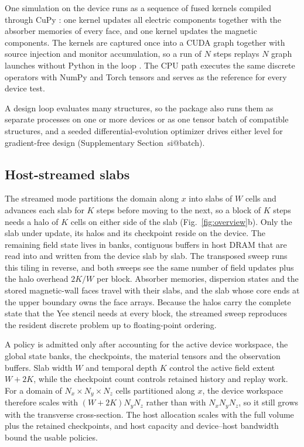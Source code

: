 \documentclass[preprint,11pt]{elsarticle}
\makeatletter
\newcommand{\suppsec}[1]{Supplementary Section~\csname si@#1\endcsname}
\makeatother
\begin{document}
One simulation on the device runs as a sequence of fused kernels compiled through CuPy \citep{okuta2017}: one kernel updates all electric components together with the absorber memories of every face, and one kernel updates the magnetic components. The kernels are captured once into a CUDA graph together with source injection and monitor accumulation, so a run of $N$ steps replays $N$ graph launches without Python in the loop \citep{paszke2019}. The CPU path executes the same discrete operators with NumPy and Torch tensors and serves as the reference for every device test.

A design loop evaluates many structures, so the package also runs them as separate processes on one or more devices or as one tensor batch of compatible structures, and a seeded differential-evolution optimizer \citep{storn1997} drives either level for gradient-free design (\suppsec{batch}).

\subsection{Host-streamed slabs}
\label{sec:streaming}

The streamed mode partitions the domain along $x$ into slabs of $W$ cells and advances each slab for $K$ steps before moving to the next, so a block of $K$ steps needs a halo of $K$ cells on either side of the slab (Fig.~\ref{fig:overview}b). Only the slab under update, its halos and its checkpoint reside on the device. The remaining field state lives in banks, contiguous buffers in host DRAM that are read into and written from the device slab by slab. The transposed sweep runs this tiling in reverse, and both sweeps see the same number of field updates plus the halo overhead $2K/W$ per block. Absorber memories, dispersion states and the stored magnetic-wall faces travel with their slabs, and the slab whose core ends at the upper boundary owns the face arrays. Because the halos carry the complete state that the Yee stencil needs at every block, the streamed sweep reproduces the resident discrete problem up to floating-point ordering.

A policy is admitted only after accounting for the active device workspace, the global state banks, the checkpoints, the material tensors and the observation buffers. Slab width $W$ and temporal depth $K$ control the active field extent $W+2K$, while the checkpoint count controls retained history and replay work. For a domain of $N_x\times N_y\times N_z$ cells partitioned along $x$, the device workspace therefore scales with $(W+2K)N_yN_z$ rather than with $N_xN_yN_z$, so it still grows with the transverse cross-section. The host allocation scales with the full volume plus the retained checkpoints, and host capacity and device--host bandwidth bound the usable policies.
\end{document}
